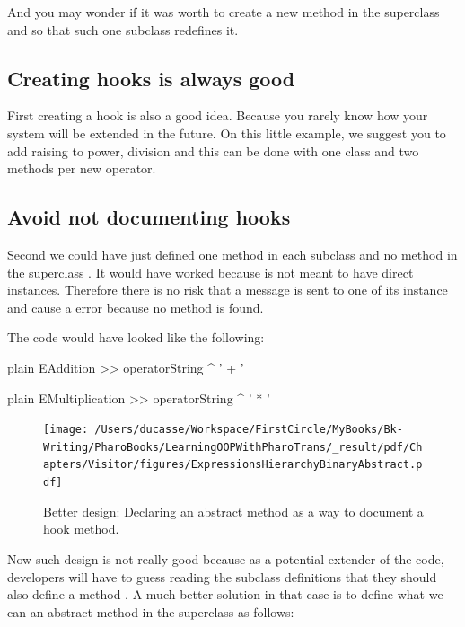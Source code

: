 \documentclass[10pt,twoside,english]{_support/latex/sbabook/sbabook}
\begin{document}
And you may wonder if it was worth to create a new method in the superclass and so that such one subclass redefines it. 
\subsection{Creating hooks is always good}
First creating a hook is also a good idea. Because you rarely know how your system will be extended in the future. On this little example, we suggest you to add raising to power, division and this can be done with one class and two methods per new operator. 
\subsection{Avoid not documenting hooks}
Second we could have just defined one method  in each subclass and no method in the superclass . It would have worked because  is not meant to have direct instances. Therefore there is no risk that a  message is sent to one of its instance and cause a error because no method  is found. 

The code would have looked like the following: 

\begin{displaycode}{plain}
EAddition >> operatorString
	^ ' + '
\end{displaycode}

\begin{displaycode}{plain}
EMultiplication >> operatorString
	^ ' * '
\end{displaycode}


\begin{figure}

\begin{center}
\texttt{[image: /Users/ducasse/Workspace/FirstCircle/MyBooks/Bk-Writing/PharoBooks/LearningOOPWithPharoTrans/\_result/pdf/Chapters/Visitor/figures/ExpressionsHierarchyBinaryAbstract.pdf]}\caption{Better design: Declaring an abstract method as a way to document a hook method.\label{figExpressionsHierarchyBinaryAbstract}}\end{center}
\end{figure}


Now such design is not really good because as a potential extender of the code, developers will have to guess reading the subclass definitions that they should also define a method . A much better solution in that case is to define what we can an abstract method in the superclass as follows: 
\end{document}
